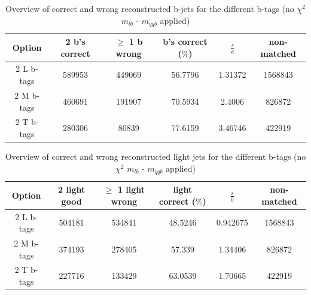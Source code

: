 \begin{table}[!h] 
 \begin{tabular}{c|c|c|c|c|c} 
  \textbf{Option} & 2 b's correct & $\geq$ 1 b wrong     & b's correct ($\%$)   & $\frac{s}{b}$ & non-matched \\ \hline 
  2 L b-tags              & 589953 & 449069 & 56.7796 & 1.31372 & 1568843\\ 
  2 M b-tags              & 460691 & 191907 & 70.5934 & 2.4006 & 826872\\ 
  2 T b-tags              & 280306 & 80839 & 77.6159 & 3.46746 & 422919\\ 
 \end{tabular} 
 \caption{Overview of correct and wrong reconstructed b-jets for the different b-tags (no $\chi^{2}$ $m_{lb}$ - $m_{qqb}$ applied)}
\end{table} 
 
\begin{table}[!h] 
 \begin{tabular}{c|c|c|c|c|c} 
  \textbf{Option} & 2 light good  & $\geq$ 1 light wrong & light correct ($\%$) & $\frac{s}{b}$ & non-matched \\ \hline 
  2 L b-tags              & 504181 & 534841 & 48.5246 & 0.942675 & 1568843\\ 
  2 M b-tags              & 374193 & 278405 & 57.339 & 1.34406 & 826872\\ 
  2 T b-tags              & 227716 & 133429 & 63.0539 & 1.70665 & 422919\\ 
 \end{tabular} 
 \caption{Overview of correct and wrong reconstructed light jets for the different b-tags (no $\chi^{2}$ $m_{lb}$ - $m_{qqb}$ applied)}
\end{table} 


